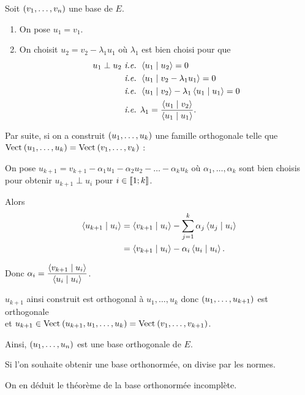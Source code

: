 \begin{dem}
Soit \(\left(v_1,\dots,v_n\right)\) une base de \(E\).

\begin{enumerate}
    \item On pose \(u_1=v_1\). \\
    \item On choisit \(u_2=v_2-\lambda_1u_1\) où \(\lambda_1\) est bien choisi pour que \[\begin{aligned}
        u_1\perp u_2&\text{ \ie }\ps{u_1}{u_2}=0 \\
        &\text{ \ie }\ps{u_1}{v_2-\lambda_1u_1}=0 \\
        &\text{ \ie }\ps{u_1}{v_2}-\lambda_1\ps{u_1}{u_1}=0 \\
        &\text{ \ie }\lambda_1=\dfrac{\ps{u_1}{v_2}}{\ps{u_1}{u_1}}.
    \end{aligned}\]
\end{enumerate}

Par suite, si on a construit \(\left(u_1,\dots,u_k\right)\) une famille orthogonale telle que \\ \(\Vect{u_1,\dots,u_k}=\Vect{v_1,\dots,v_k}\) :

On pose \(u_{k+1}=v_{k+1}-\alpha_1u_1-\alpha_2u_2-\dots-\alpha_ku_k\) où \(\alpha_1,\dots,\alpha_k\) sont bien choisis pour obtenir \(u_{k+1}\perp u_i\) pour \(i\in\left\llbracket1;k\right\rrbracket\).

Alors \[\begin{aligned}
\ps{u_{k+1}}{u_i}&=\ps{v_{k+1}}{u_i}-\sum_{j=1}^k\alpha_j\ps{u_j}{u_i} \\
&=\ps{v_{k+1}}{u_i}-\alpha_i\ps{u_i}{u_i}.
\end{aligned}\]

Donc \(\alpha_i=\dfrac{\ps{v_{k+1}}{u_i}}{\ps{u_i}{u_i}}\).

\(u_{k+1}\) ainsi construit est orthogonal à \(u_1,\dots,u_k\) donc \(\left(u_1,\dots,u_{k+1}\right)\) est orthogonale \\ et \(u_{k+1}\in\Vect{u_{k+1},u_1,\dots,u_k}=\Vect{v_1,\dots,v_{k+1}}\).

Ainsi, \(\left(u_1,\dots,u_n\right)\) est une base orthogonale de \(E\).
\end{dem}

\begin{rem}
Si l'on souhaite obtenir une base orthonormée, on divise par les normes.
\end{rem}

On en déduit le théorème de la base orthonormée incomplète.

